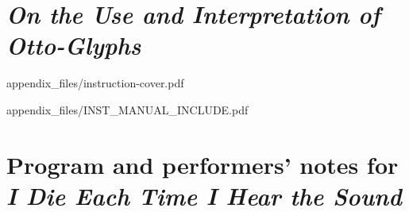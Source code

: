 
\appendix


\chapter{\textit{On the Use and Interpretation of Otto-Glyphs}}


    
    {appendix_files/instruction-cover.pdf}
    
    
    {appendix_files/INST_MANUAL_INCLUDE.pdf}
    

\chapter{Program and performers' notes for \textit{I Die Each Time I Hear the Sound}}
    
        

